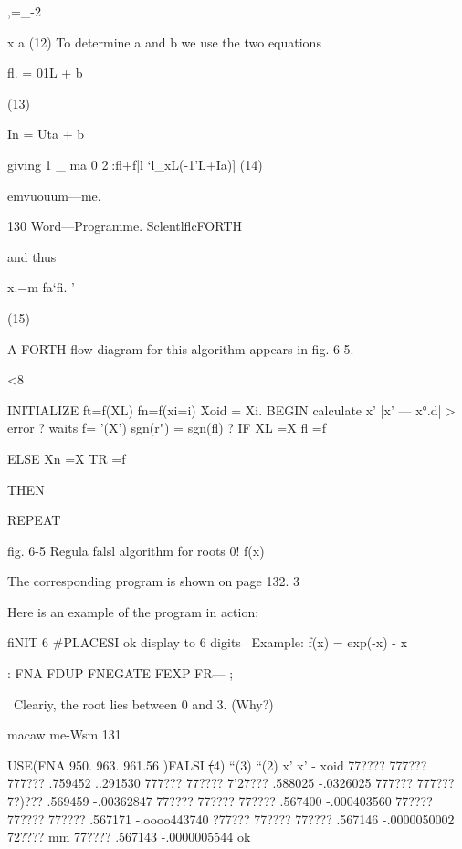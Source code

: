 {,=_-2

x a (12)
To determine a and b we use the two equations

fl. = 01L + b

(13)

In = Uta + b

giving
1 _ ma
0 2|:fl+f|l ‘l_xL(-1'L+Ia)] (14)

emvuouum—me.

130 Word—Programme. SclentlflcFORTH

and thus

x.=m
fa‘fi. '

(15)

A FORTH flow diagram for this algorithm appears in fig. 6-5.

 

<8

 

 

 

 

 

 

 

 

 

 

 

 

 

 

INITIALIZE
ft=f(XL) fn=f(xi=i)
Xoid = Xi.
BEGIN calculate x’
|x' — x°.d| > error
?
waits
f= '(X’)
sgn(r") = sgn(fl) ?
IF XL =X fl =f

ELSE Xn =X TR =f

THEN

 

REPEAT

fig. 6-5 Regula falsl algorithm for roots 0! f(x)

The corresponding program is shown on page 132. 3

Here is an example of the program in action:

fiNIT 6 #PLACESI ok \set display to 6 digits
\ Example: f(x) = exp(-x) - x

: FNA FDUP FNEGATE FEXP FR— ;

\ Cleariy, the root lies between 0 and 3. (Why?)

macaw me-Wsm 131

USE(FNA 950. 963. 961.56 )FALSI
\st(4) “(3) “(2) x' x' - xoid
77???? 777??? 777??? .759452 ..291530
777??? 77???? 7'27??? .588025 -.0326025
777??? 777??? 7?)??? .569459 -.00362847
77???? 77???? 77???? .567400 -.000403560
77???? 77???? 77???? .567171 -.oooo443740
?77??? 77???? 77???? .567146 -.0000050002
72???? mm 77???? .567143 -.0000005544 ok

}
